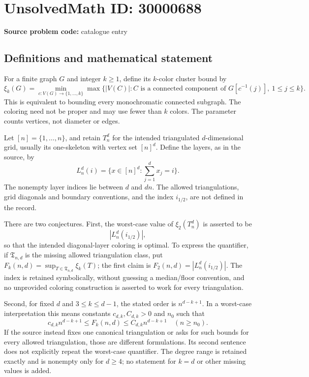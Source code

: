 \documentclass[11pt]{article}
\begin{document}
\section*{UnsolvedMath ID: 30000688}
\textbf{Source problem code:} catalogue entry
\subsection{Definitions and mathematical statement}
For a finite graph \(G\) and integer \(k\geq1\), define its \(k\)-color cluster bound by
\[
 \xi_k(G)=\min_{c:V(G)\to\{1,\ldots,k\}}
 \max\{|V(C)|:C\text{ is a connected component of }G[c^{-1}(j)],\ 1\leq j\leq k\}.
\]
This is equivalent to bounding every monochromatic connected subgraph. The coloring need not be proper and may use fewer than \(k\) colors. The parameter counts vertices, not diameter or edges.

Let \([n]=\{1,\ldots,n\}\), and retain \(T_n^d\) for the intended triangulated \(d\)-dimensional grid, usually its one-skeleton with vertex set \([n]^d\). Define the layers, as in the source, by
\[
 L_n^d(i)=\{x\in[n]^d:\sum_{j=1}^d x_j=i\}.
\]
The nonempty layer indices lie between \(d\) and \(dn\). The allowed triangulations, grid diagonals and boundary conventions, and the index \(i_{1/2}\), are not defined in the record.

There are two conjectures. First, the worst-case value of \(\xi_2(T_n^d)\) is asserted to be
\[
 |L_n^d(i_{1/2})|,
\]
so that the intended diagonal-layer coloring is optimal. To express the quantifier, if \(\mathfrak T_{n,d}\) is the missing allowed triangulation class, put \(F_k(n,d)=\sup_{T\in\mathfrak T_{n,d}}\xi_k(T)\); the first claim is \(F_2(n,d)=|L_n^d(i_{1/2})|\). The index is retained symbolically, without guessing a median/floor convention, and no unprovided coloring construction is asserted to work for every triangulation.

Second, for fixed \(d\) and \(3\leq k\leq d-1\), the stated order is \(n^{d-k+1}\). In a worst-case interpretation this means constants \(c_{d,k},C_{d,k}>0\) and \(n_0\) such that
\[
 c_{d,k}n^{d-k+1}\leq F_k(n,d)\leq C_{d,k}n^{d-k+1}
 \quad(n\geq n_0).
\]
If the source instead fixes one canonical triangulation or asks for such bounds for every allowed triangulation, those are different formulations. Its second sentence does not explicitly repeat the worst-case quantifier. The degree range is retained exactly and is nonempty only for \(d\geq4\); no statement for \(k=d\) or other missing values is added.
\end{document}
